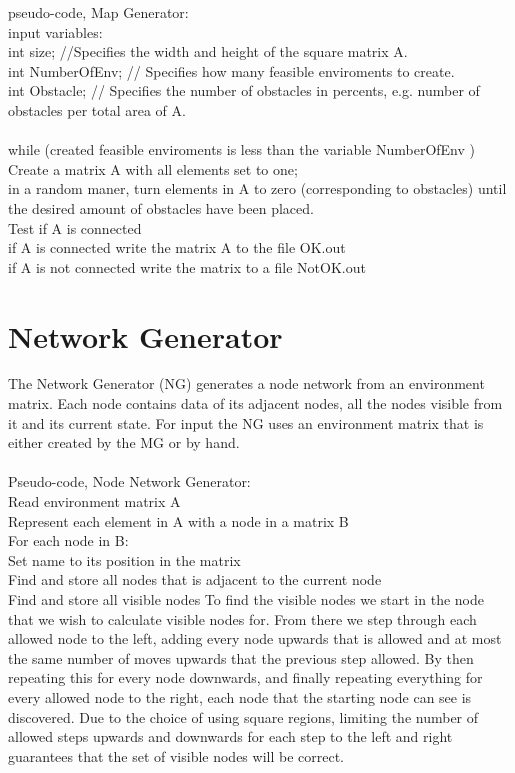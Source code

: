 pseudo-code, Map Generator:\\
input variables:\\
int size; //Specifies the width and height of the square matrix  A.\\
int NumberOfEnv; // Specifies how many feasible enviroments to create.\\
int Obstacle; //  Specifies the number of obstacles in percents, e.g. number of obstacles per total area of A.\\
\\
while (created feasible enviroments is less than the variable NumberOfEnv )\\
	Create a matrix A with all elements set to one; \\
	in a random maner, turn elements in A to zero (corresponding to obstacles) until the desired amount of obstacles have been placed.\\
	Test if A is connected\\
	if A is connected write the matrix A to the file OK.out\\
	if A is not connected write the matrix to a file NotOK.out\\


\section{Network Generator}
The Network Generator (NG) generates a node network from an environment matrix. Each node contains data of its adjacent nodes, all the nodes visible from it and its current state. For input the NG uses an environment matrix that is either created by the MG or by hand.\\
\\
\noindent Pseudo-code, Node Network Generator:\\
\indent Read environment matrix A\\
\indent Represent each element in A with a node in a matrix B\\
\indent For each node in B:\\
\indent \indent Set name to its position in the matrix\\
\indent \indent Find and store all nodes that is adjacent to the current node\\
\indent \indent Find and store all visible nodes
To find the visible nodes we start in the node that we wish to calculate visible nodes for. From there we step through each allowed node to the left, adding every node upwards that is allowed and at most the same number of moves upwards that the previous step allowed. By then repeating this for every node downwards, and finally repeating everything for every allowed node to the right, each node that the starting node can see is discovered. Due to the choice of using square regions, limiting the number of allowed steps upwards and downwards for each step to the left and right guarantees that the set of visible nodes will be correct.